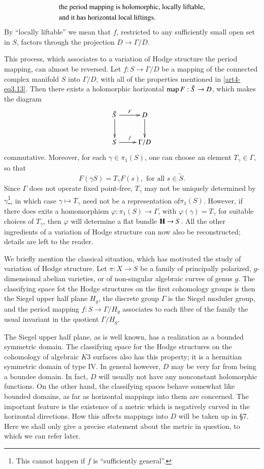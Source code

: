\begin{align}
& \text{the period mapping is holomorphic, locally liftable,}\notag\\
& \text{and it has horizontal local liftings}. \label{art4-eq3.13}
\end{align}
By ``locally liftable'' we mean that $f$, restricted to any sufficiently small open set in $S$, factors through the projection $D \to \Gamma / D$.

This process, which associates to a variation of Hodge structure the period mapping, can almost be reversed. Let $f: S \to \Gamma / D$ be a mapping of the connected complex manifold $S$ into $\Gamma/ D$, with all of the properties mentioned in \eqref{art4-eq3.13}. Then there exists a holomorphic horizontal $\operatorname{map} F : \tilde{S} \to D$, which makes the diagram
$$
\xymatrix{
\tilde{S} \ar[d] \ar[r]^F & D \ar[d]\\
S \ar[r]^f & \Gamma / D
}
$$
commutative. Moreover, for each $\gamma \in \pi_1 (S)$, one can choose an element $T_{\gamma} \in \Gamma$, so that
$$
F (\gamma S) = T_{\gamma} F(s), \text{ for all } s \in \tilde{S}.
$$
Since $\Gamma$ does not operate fixed point-free, $T_{\gamma}$ may not be uniquely determined by $\gamma$\footnote[9]{This cannot happen if $f$ is ``sufficiently general''.}, in which case $\gamma \longmapsto T_\gamma$ need not be a representation of\pageoriginale $\pi_1 (S)$. However, if there does exits a homomorphism $\varphi : \pi_1 (S) \to \Gamma$, with $\varphi (\gamma) = T_\gamma$ for suitable choices of $T_\gamma$, then $\varphi$ will determine a flat bundle $\mathbf{H} \to S$. All the other ingredients of a variation of Hodge structure can now also be reconstructed; details are left to the reader.

We briefly mention the classical situation, which has motivated the study of variation of Hodge structure. Let $\pi : X \to S$ be a family of principally polarized, $g$-dimensional abelian varieties, or of non-singular algebraic curves of genus $g$. The classifying space fot the Hodge structures on the first cohomology groups is then the Siegel upper half plane $H_g$, the discrete group $\Gamma$ is the Siegel moduler group, and the period mapping $f: S \to \Gamma / H_g$ associates to each fibre of the family the usual invariant in the quotient $\Gamma / H_g$.

The Siegel upper half plane, as is well known, has a realization as a bounded symmetric domain. The classifying space for the Hodge structures on the cohomology of algebraic $K3$ surfaces also has this property; it is a hermitian symmetric domain of type IV. In general however, $D$ may be very far from being a boundee domain. In fact, $D$ will usually not have any nonconstant holomorphic functions. On the other hand, the classifying spaces behave somewhat like bounded domains, as far as horizontal mappings into them are concerned. The important feature is the existence of a metric which is negatively curved in the horizontal directions. How this affects mappings into $D$ will be taken up in \S 7. Here we shall only give a precise statement about the metric in question, to which we can refer later.

